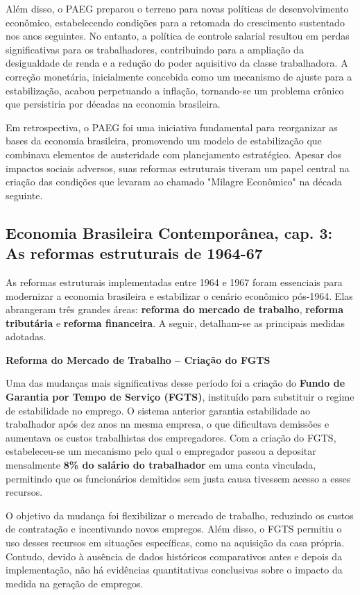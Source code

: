 \documentclass[a4paper,12pt]{article}[abntex2]
\begin{document}
Além disso, o PAEG preparou o terreno para novas políticas de desenvolvimento econômico, estabelecendo condições para a retomada do crescimento sustentado nos anos seguintes. No entanto, a política de controle salarial resultou em perdas significativas para os trabalhadores, contribuindo para a ampliação da desigualdade de renda e a redução do poder aquisitivo da classe trabalhadora. A correção monetária, inicialmente concebida como um mecanismo de ajuste para a estabilização, acabou perpetuando a inflação, tornando-se um problema crônico que persistiria por décadas na economia brasileira.

Em retrospectiva, o PAEG foi uma iniciativa fundamental para reorganizar as bases da economia brasileira, promovendo um modelo de estabilização que combinava elementos de austeridade com planejamento estratégico. Apesar dos impactos sociais adversos, suas reformas estruturais tiveram um papel central na criação das condições que levaram ao chamado "Milagre Econômico" na década seguinte.

\subsection{\textbf{Economia Brasileira Contemporânea, cap. 3: As reformas estruturais de 1964-67}}

As reformas estruturais implementadas entre 1964 e 1967 foram essenciais para modernizar a economia brasileira e estabilizar o cenário econômico pós-1964. Elas abrangeram três grandes áreas: 			\textbf{reforma do mercado de trabalho}, 			\textbf{reforma tributária} e 			\textbf{reforma financeira}. A seguir, detalham-se as principais medidas adotadas.

\textbf{Reforma do Mercado de Trabalho – Criação do FGTS}

Uma das mudanças mais significativas desse período foi a criação do 			\textbf{Fundo de Garantia por Tempo de Serviço (FGTS)}, instituído para substituir o regime de estabilidade no emprego. O sistema anterior garantia estabilidade ao trabalhador após dez anos na mesma empresa, o que dificultava demissões e aumentava os custos trabalhistas dos empregadores. Com a criação do FGTS, estabeleceu-se um mecanismo pelo qual o empregador passou a depositar mensalmente 			\textbf{8\% do salário do trabalhador} em uma conta vinculada, permitindo que os funcionários demitidos sem justa causa tivessem acesso a esses recursos.

O objetivo da mudança foi flexibilizar o mercado de trabalho, reduzindo os custos de contratação e incentivando novos empregos. Além disso, o FGTS permitiu o uso desses recursos em situações específicas, como na aquisição da casa própria. Contudo, devido à ausência de dados históricos comparativos antes e depois da implementação, não há evidências quantitativas conclusivas sobre o impacto da medida na geração de empregos.
\end{document}
